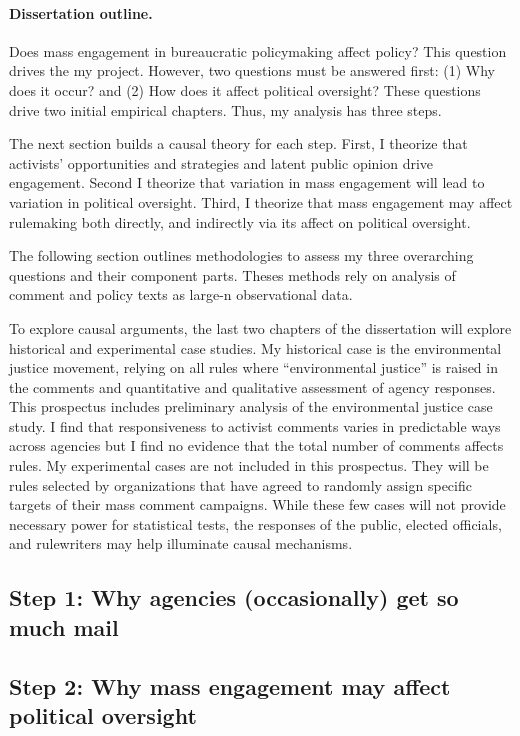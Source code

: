 \documentclass{article}
\begin{document}
\paragraph{Dissertation outline.}
Does mass engagement in bureaucratic policymaking affect policy? This question drives the my project. However, two questions must be answered first: (1) Why does it occur? and (2) How does it affect political oversight? These questions drive two initial empirical chapters. Thus, my analysis has three steps.

The next section builds a causal theory for each step. First, I theorize that activists' opportunities and strategies and latent public opinion drive engagement. Second I theorize that variation in mass engagement will lead to variation in political oversight. Third, I theorize that mass engagement may affect rulemaking both directly, and indirectly via its affect on political oversight.

The following section outlines methodologies to assess my three overarching questions and their component parts. Theses methods rely on analysis of comment and policy texts as large-n observational data. 

To explore causal arguments, the last two chapters of the dissertation will explore historical and experimental case studies. My historical case is the environmental justice movement, relying on all rules where ``environmental justice'' is raised in the comments and quantitative and qualitative assessment of agency responses. This prospectus includes preliminary analysis of the environmental justice case study. I find that responsiveness to activist comments varies in predictable ways across agencies but I find no evidence that the total number of comments affects rules. My experimental cases are not included in this prospectus. They will be rules selected by organizations that have agreed to randomly assign specific targets of their mass comment campaigns. While these few cases will not provide necessary power for statistical tests, the responses of the public, elected officials, and rulewriters may help illuminate causal mechanisms.


\subsection{Step 1: Why agencies (occasionally) get so much mail} \label{whymail-intro}


\subsection{Step 2: Why mass engagement may affect political oversight} \label{principals-intro}

\end{document}
